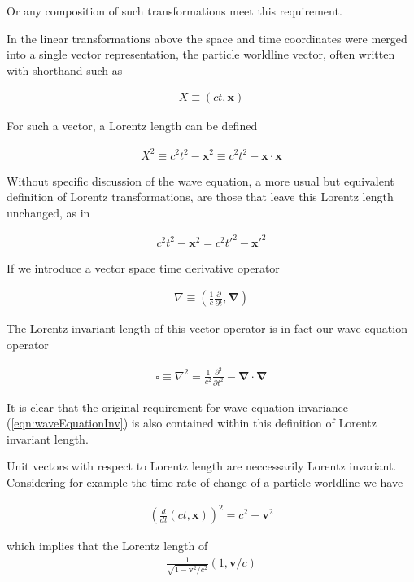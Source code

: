 \documentclass[]{eliblog}
\newcommand{\Bv}[0]{\mathbf{v}}
\newcommand{\Bx}[0]{\mathbf{x}}
\newcommand{\spacegrad}[0]{\boldsymbol{\nabla}}
\newcommand{\inv}[1]{\frac{1}{#1}}
\newcommand{\grad}[0]{\nabla}
\begin{document}
Or any composition of such transformations meet this requirement.

In the linear transformations above the space and time coordinates were merged into a single vector representation,
the particle worldline vector, often written with shorthand such as

\begin{align}
X \equiv (ct, \Bx)
\end{align}

For such a vector, a Lorentz length can be defined

\begin{align}
X^2 \equiv c^2 t^2 - \Bx^2 \equiv c^2 t^2 - \Bx \cdot \Bx
\end{align}

Without specific discussion of the wave equation, 
a more usual but equivalent definition of Lorentz transformations, are those that leave this
Lorentz length unchanged, as in

\begin{align}
c^2 t^2 - \Bx^2 = c^2 {t'}^2 - {\Bx'}^2 
\end{align}

If we introduce a vector space time derivative operator

\begin{align}
\grad \equiv \left(\inv{c}\frac{\partial}{\partial t}, \spacegrad \right)
\end{align}

The Lorentz invariant length of this vector operator is in fact our wave equation operator

\begin{align}
\square \equiv \grad^2 = \inv{c^2}\frac{\partial^2}{\partial t^2} - \spacegrad \cdot \spacegrad
\end{align}

It is clear that the original requirement for wave equation invariance (\ref{eqn:waveEquationInv}) is also contained within 
this definition of Lorentz invariant length.

Unit vectors with respect to Lorentz length are neccessarily Lorentz invariant.  Considering for example the time rate of change of
a particle worldline we have

\begin{align}
\left(\frac{d}{dt}(ct, \Bx) \right)^2 = c^2 - \Bv^2
\end{align}

which implies that the Lorentz length of
\begin{align}
\frac{1}{\sqrt{1 - \Bv^2/c^2}}(1, \Bv/c)
\end{align}
\end{document}
